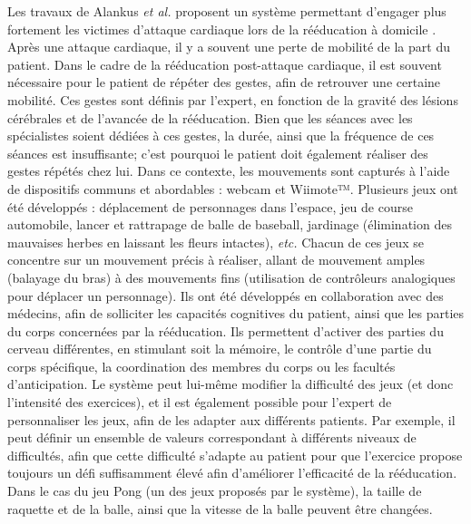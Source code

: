 Les travaux de Alankus \textit{et al.} proposent un système permettant d'engager plus fortement les victimes d'attaque cardiaque lors de la rééducation à domicile \parencite{Alankus2010TCG}. Après une attaque cardiaque, il y a souvent une perte de mobilité de la part du patient. Dans le cadre de la rééducation post-attaque cardiaque, il est souvent nécessaire pour le patient de répéter des gestes, afin de retrouver une certaine mobilité. Ces gestes sont définis par l'expert, en fonction de la gravité des lésions cérébrales et de l'avancée de la rééducation. Bien que les séances avec les spécialistes soient dédiées à ces gestes, la durée, ainsi que la fréquence de ces séances est insuffisante; c'est pourquoi le patient doit également réaliser des gestes répétés chez lui.
Dans ce contexte, les mouvements sont capturés à l'aide de dispositifs communs et abordables : webcam et Wiimote™. Plusieurs jeux ont été développés : déplacement de personnages dans l'espace, jeu de course automobile, lancer et rattrapage de balle de baseball, jardinage (élimination des mauvaises herbes en laissant les fleurs intactes), \textit{etc.} Chacun de ces jeux se concentre sur un mouvement précis à réaliser, allant de mouvement amples (balayage du bras) à des mouvements fins (utilisation de contrôleurs analogiques pour déplacer un personnage). Ils ont été développés en collaboration avec des médecins, afin de solliciter les capacités cognitives du patient, ainsi que les parties du corps concernées par la rééducation. Ils permettent d'activer des parties du cerveau différentes, en stimulant soit la mémoire, le contrôle d'une partie du corps spécifique, la coordination des membres du corps ou les facultés d'anticipation. Le système peut lui-même modifier la difficulté des jeux (et donc l'intensité des exercices), et il est également possible pour l'expert de personnaliser les jeux, afin de les adapter aux différents patients. Par exemple, il peut définir un ensemble de valeurs correspondant à différents niveaux de difficultés, afin que cette difficulté s'adapte au patient pour que l'exercice propose toujours un défi suffisamment élevé afin d'améliorer l'efficacité de la rééducation. Dans le cas du jeu Pong (un des jeux proposés par le système), la taille de raquette et de la balle, ainsi que la vitesse de la balle peuvent être changées.

